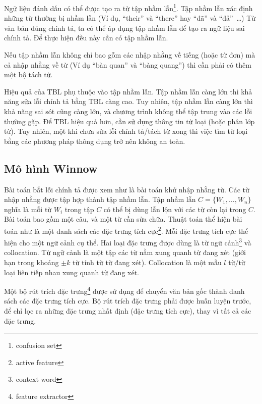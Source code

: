 \documentclass[a4paper,oneside,14pt]{extbook} %
\begin{document}
Ngữ liệu đánh dấu có thể được tạo ra từ tập nhầm
lẫn\footnote{confusion set}. Tập nhầm lẫn xác định những từ thường bị
nhầm lẫn (Ví dụ, ``their'' và ``there'' hay ``đã'' và ``đả''~\ldots{})
Từ văn bản đúng chính tả, ta có thể áp dụng tập nhầm lẫn để tạo ra ngữ
liệu sai chính tả. Để thực hiện đều này cần có tập nhầm lẫn.

Nếu tập nhầm lẫn không chỉ bao gỗm các nhập nhằng về tiếng (hoặc từ
đơn) mà cả nhập nhằng về từ (Ví dụ ``bàn quan'' và ``bàng quang'') thì
cần phải có thêm một bộ tách từ.

Hiệu quả của TBL phụ thuộc vào tập nhầm lẫn. Tập nhầm lẫn càng lớn
thì khả năng sửa lỗi chính tả bằng TBL càng cao. Tuy nhiên, tập nhầm
lẫn càng lớn thì khả năng sai sót cũng càng lớn, và chương trình không
thể tập trung vào các lỗi thường gặp. Để TBL hiệu quả hơn, cần sử dụng
thông tin từ loại (hoặc phân lớp từ). Tuy nhiên, một khi chưa sửa lỗi
chính tả/tách từ xong thì việc tìm từ loại bằng các phương pháp thông
dụng trở nên không an toàn.




\subsection{Mô hình Winnow}

Bài toán bắt lỗi chính tả được xem như là bài toán khử nhập nhằng
từ. Các từ nhập nhằng được tập hợp thành tập nhầm lẫn. Tập nhầm lẫn $C
= \{W_1,\ldots{},W_n\}$ nghĩa là mỗi từ $W_i$ trong tập $C$ có thể bị
dùng lẫn lộn với các từ còn lại trong $C$.
Bài toán bao gồm một câu, và một từ cần sửa chữa. Thuật toán thể hiện
bài toán như là một danh sách các đặc trưng tích cực\footnote{active
  feature}. Mỗi đặc trưng tích cực thể hiện cho một ngữ cảnh cụ
thể. Hai loại đặc trưng được dùng là từ ngữ cảnh\footnote{context
  word} và collocation. Từ ngữ cảnh là một tập các từ nằm xung quanh
từ đang xét (giới hạn trong khoảng $\pm k$ từ tính từ từ đang
xét). Collocation là một mẫu $l$ từ/từ loại liên tiếp nhau xung quanh
từ đang xét.

Một bộ rút trích đặc trưng\footnote{feature extractor} được sử dụng để
chuyển văn bản gốc thành danh sách các đặc trưng tích cực. Bộ rút
trích đặc trưng phải được huấn luyện trước, để chỉ lọc ra những đặc
trưng nhất định (đặc trưng tích cực), thay vì tất cả các đặc trưng.
\end{document}
